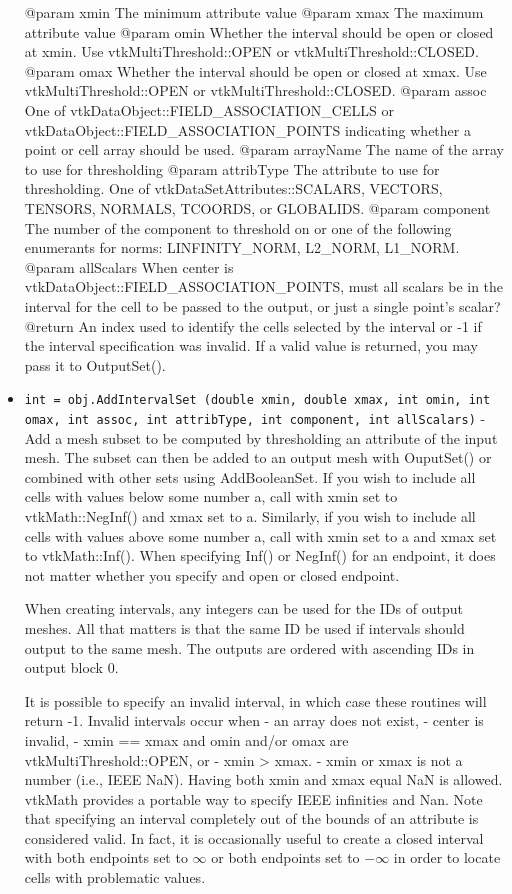 \begin{itemize}
 @param xmin The minimum attribute value
 @param xmax The maximum attribute value
 @param omin Whether the interval should be open or closed at  xmin. Use vtkMultiThreshold::OPEN or vtkMultiThreshold::CLOSED.
 @param omax Whether the interval should be open or closed at  xmax. Use vtkMultiThreshold::OPEN or vtkMultiThreshold::CLOSED.
 @param assoc One of vtkDataObject::FIELD\_ASSOCIATION\_CELLS or vtkDataObject::FIELD\_ASSOCIATION\_POINTS indicating whether 
               a point or cell array should be used.
 @param arrayName The name of the array to use for thresholding
 @param attribType The attribute to use for thresholding.
                   One of vtkDataSetAttributes::SCALARS, VECTORS, TENSORS, NORMALS, TCOORDS, or GLOBALIDS.
 @param component The number of the component to threshold on or one of the following enumerants for norms:
                  LINFINITY\_NORM, L2\_NORM, L1\_NORM.
 @param allScalars When  center is vtkDataObject::FIELD\_ASSOCIATION\_POINTS, must all scalars be in the interval for
                   the cell to be passed to the output, or just a single point's scalar?
 @return An index used to identify the cells selected by the interval or -1 if the interval specification was invalid.
         If a valid value is returned, you may pass it to OutputSet().

\item  \verb|int = obj.AddIntervalSet (double xmin, double xmax, int omin, int omax, int assoc, int attribType, int component, int allScalars)| -  Add a mesh subset to be computed by thresholding an attribute of the input mesh.
 The subset can then be added to an output mesh with OuputSet() or combined with other sets using AddBooleanSet.
 If you wish to include all cells with values below some number  a, call
 with xmin set to vtkMath::NegInf() and xmax set to  a.
 Similarly, if you wish to include all cells with values above some number  a,
 call with xmin set to  a and xmax set to vtkMath::Inf().
 When specifying Inf() or NegInf() for an endpoint, it does not matter whether
 you specify and open or closed endpoint.
 
 When creating intervals, any integers can be used for the IDs of output meshes.
 All that matters is that the same ID be used if intervals should output to the same mesh.
 The outputs are ordered with ascending IDs in output block 0.

 It is possible to specify an invalid interval, in which case these routines will return -1.
 Invalid intervals occur when
 - an array does not exist,
 -  center is invalid,
 -  xmin ==  xmax and  omin and/or  omax are vtkMultiThreshold::OPEN, or
 -  xmin >  xmax.
 -  xmin or  xmax is not a number (i.e., IEEE NaN). Having both  xmin and  xmax equal NaN is allowed.
 vtkMath provides a portable way to specify IEEE infinities and Nan.
 Note that specifying an interval completely out of the bounds of an attribute is considered valid.
 In fact, it is occasionally useful to create a closed interval with both endpoints set to $\infty$
 or both endpoints set to $-\infty$ in order to locate cells with problematic values.


\end{itemize}
